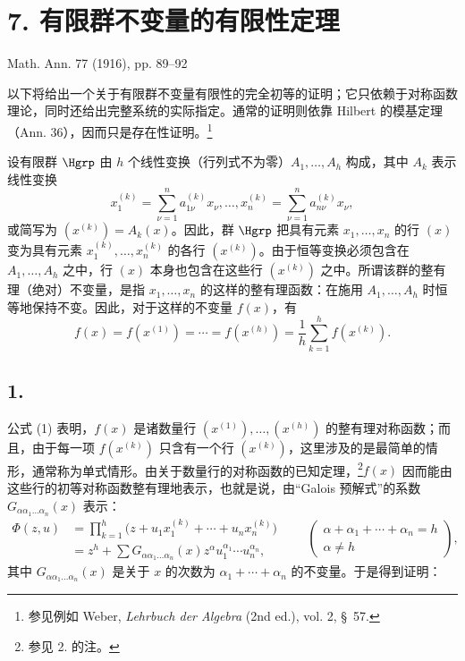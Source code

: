 \section*{7. 有限群不变量的有限性定理}
\begin{center}
Math. Ann. 77 (1916), pp. 89--92
\end{center}

以下将给出一个关于有限群不变量有限性的完全初等的证明；它只依赖于对称函数理论，同时还给出完整系统的实际指定。通常的证明则依靠 Hilbert 的模基定理（Ann. 36），因而只是存在性证明。\footnote{参见例如 Weber, \emph{Lehrbuch der Algebra} (2nd ed.), vol. 2, \S\ 57.}

设有限群 $\Hgrp$ 由 $h$ 个线性变换（行列式不为零）$A_1,\ldots,A_h$ 构成，其中 $A_k$ 表示线性变换
\[
  x_1^{(k)}=\sum_{\nu=1}^{n}a_{1\nu}^{(k)}x_\nu,\ldots,
  x_n^{(k)}=\sum_{\nu=1}^{n}a_{n\nu}^{(k)}x_\nu,
\]
或简写为 $(x^{(k)})=A_k(x)$。因此，群 $\Hgrp$ 把具有元素 $x_1,\ldots,x_n$ 的行 $(x)$ 变为具有元素 $x_1^{(k)},\ldots,x_n^{(k)}$ 的各行 $(x^{(k)})$。由于恒等变换必须包含在 $A_1,\ldots,A_h$ 之中，行 $(x)$ 本身也包含在这些行 $(x^{(k)})$ 之中。所谓该群的整有理（绝对）不变量，是指 $x_1,\ldots,x_n$ 的这样的整有理函数：在施用 $A_1,\ldots,A_h$ 时恒等地保持不变。因此，对于这样的不变量 $f(x)$，有
\begin{equation}
  f(x)=f(x^{(1)})=\cdots=f(x^{(h)})=
  \frac1h\sum_{k=1}^{h}f(x^{(k)}).
\tag{1}
\end{equation}

\subsection*{1.}
公式 (1) 表明，$f(x)$ 是诸数量行 $(x^{(1)}),\ldots,(x^{(h)})$ 的整有理对称函数；而且，由于每一项 $f(x^{(k)})$ 只含有一个行 $(x^{(k)})$，这里涉及的是最简单的情形，通常称为单式情形。由关于数量行的对称函数的已知定理，\footnote{参见 2. 的注。}$f(x)$ 因而能由这些行的初等对称函数整有理地表示，也就是说，由“Galois 预解式”的系数 $G_{\alpha\alpha_1\ldots\alpha_n}(x)$ 表示：
\[
\begin{aligned}
  \Phi(z,u)
  &=\prod_{k=1}^{h}\bigl(z+u_1x_1^{(k)}+\cdots+u_nx_n^{(k)}\bigr) \\
  &=z^h+
    \sum G_{\alpha\alpha_1\ldots\alpha_n}(x)
    z^{\alpha}u_1^{\alpha_1}\cdots u_n^{\alpha_n},
\end{aligned}
\qquad
\left(\begin{array}{c}
\alpha+\alpha_1+
\cdots+
\alpha_n=h\\
\alpha\ne h
\end{array}\right),
\]
其中 $G_{\alpha\alpha_1\ldots\alpha_n}(x)$ 是关于 $x$ 的次数为 $\alpha_1+\cdots+\alpha_n$ 的不变量。于是得到证明：

